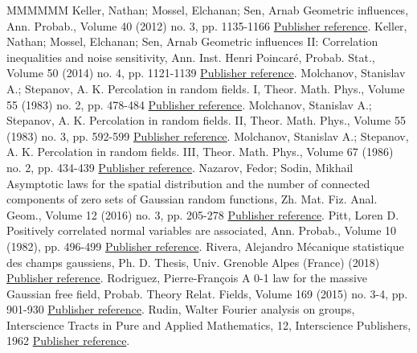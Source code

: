 \documentclass[11pt]{article}
\theoremstyle{definition}
\numberwithin{equation}{section}
\begin{document}
\begin{thebibliography}{MMMMMM}
 Keller, Nathan; Mossel, Elchanan; Sen, Arnab Geometric influences, Ann. Probab., Volume 40 (2012) no. 3, pp. 1135-1166 \href{https://ahl.centre-mersenne.org/item/AHL_2020__3__169_0/#keller2012geometric}{Publisher reference}.
 Keller, Nathan; Mossel, Elchanan; Sen, Arnab Geometric influences II: Correlation inequalities and noise sensitivity, Ann. Inst. Henri Poincaré, Probab. Stat., Volume 50 (2014) no. 4, pp. 1121-1139 \href{https://ahl.centre-mersenne.org/item/AHL_2020__3__169_0/#keller2014geometric}{Publisher reference}.
 Molchanov, Stanislav A.; Stepanov, A. K. Percolation in random fields. I, Theor. Math. Phys., Volume 55 (1983) no. 2, pp. 478-484 \href{https://ahl.centre-mersenne.org/item/AHL_2020__3__169_0/#molchanov1983percolationi}{Publisher reference}.
 Molchanov, Stanislav A.; Stepanov, A. K. Percolation in random fields. II, Theor. Math. Phys., Volume 55 (1983) no. 3, pp. 592-599 \href{https://ahl.centre-mersenne.org/item/AHL_2020__3__169_0/#molchanov1983percolationii}{Publisher reference}.
 Molchanov, Stanislav A.; Stepanov, A. K. Percolation in random fields. III, Theor. Math. Phys., Volume 67 (1986) no. 2, pp. 434-439 \href{https://ahl.centre-mersenne.org/item/AHL_2020__3__169_0/#molchanov1986percolationiii}{Publisher reference}.
 Nazarov, Fedor; Sodin, Mikhail Asymptotic laws for the spatial distribution and the number of connected components of zero sets of Gaussian random functions, Zh. Mat. Fiz. Anal. Geom., Volume 12 (2016) no. 3, pp. 205-278 \href{https://ahl.centre-mersenne.org/item/AHL_2020__3__169_0/#nazarov2015asymptotic}{Publisher reference}.
 Pitt, Loren D. Positively correlated normal variables are associated, Ann. Probab., Volume 10 (1982), pp. 496-499 \href{https://ahl.centre-mersenne.org/item/AHL_2020__3__169_0/#pitt1982positively}{Publisher reference}.
 Rivera, Alejandro Mécanique statistique des champs gaussiens, Ph. D. Thesis, Univ. Grenoble Alpes (France) (2018) \href{https://ahl.centre-mersenne.org/item/AHL_2020__3__169_0/#alelele}{Publisher reference}.
 Rodriguez, Pierre-François A 0-1 law for the massive Gaussian free field, Probab. Theory Relat. Fields, Volume 169 (2015) no. 3-4, pp. 901-930 \href{https://ahl.centre-mersenne.org/item/AHL_2020__3__169_0/#rodriguez20150}{Publisher reference}.
 Rudin, Walter Fourier analysis on groups, Interscience Tracts in Pure and Applied Mathematics, 12, Interscience Publishers, 1962 \href{https://ahl.centre-mersenne.org/item/AHL_2020__3__169_0/#rud_fou}{Publisher reference}.

\end{thebibliography}
\end{document}
